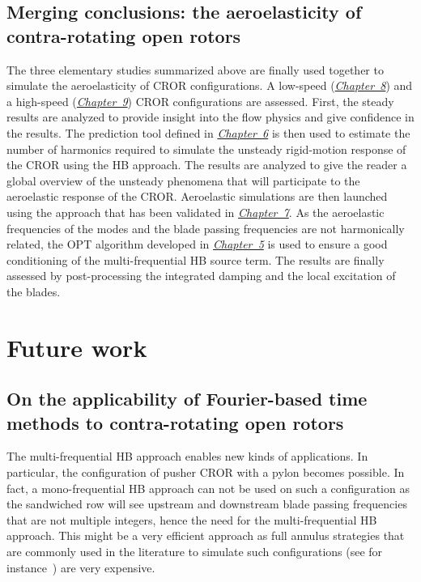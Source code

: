 \subsection*{Merging conclusions: the aeroelasticity of contra-rotating open rotors}

The three elementary studies summarized above 
are finally used together 
to simulate the aeroelasticity
of CROR configurations. A low-speed 
(\hyperref[cha:dream_ls_isolated]{\emph{Chapter~8}})
and a high-speed (\hyperref[cha:dream_hs_isolated]{\emph{Chapter~9}})
CROR configurations are assessed. First,
the steady results are analyzed to provide insight into the flow
physics and give confidence in the results. The prediction tool
defined in \hyperref[cha:limitations_convergence]{\emph{Chapter~6}}
is then used to estimate the number of harmonics required to
simulate the unsteady rigid-motion response of the CROR using the HB approach.
The results are analyzed
to give the reader a global overview of the unsteady phenomena
that will participate to the aeroelastic response of the CROR.
Aeroelastic simulations are then launched using the 
approach that has been validated in \hyperref[cha:stcf11]{\emph{Chapter~7}}.
As the aeroelastic frequencies of the modes and the blade passing frequencies
are not harmonically related, the OPT algorithm developed in 
\hyperref[cha:limitations_condition_number]{\emph{Chapter~5}}
is used to ensure a good conditioning of the multi-frequential
HB source term. 
The results are finally assessed by post-processing the integrated damping
and the local excitation of the blades.

\section*{Future work}

\subsection*{On the applicability of Fourier-based time methods to contra-rotating open rotors}

The multi-frequential HB approach enables new
kinds of applications. In particular, 
the configuration of pusher CROR with a pylon becomes possible.
In fact, a mono-frequential HB approach can not be
used on such a configuration as the sandwiched row will see upstream
and downstream
blade passing frequencies that are not multiple integers, hence
the need for the multi-frequential HB approach.
This might be a very efficient approach as full annulus
strategies that are commonly used in the literature to simulate such
configurations (see for instance~\citet{Stuermer2008})
are very expensive.

